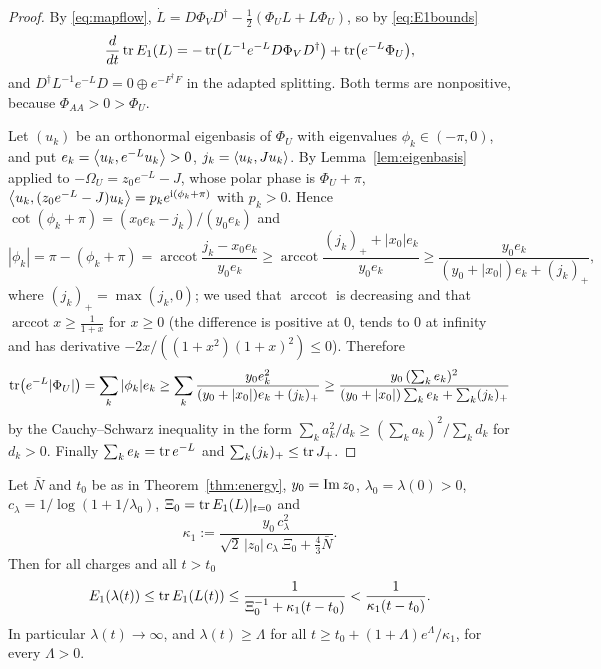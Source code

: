 \begin{proof}
By \eqref{eq:mapflow},
$\dot L=D\Phi_VD^\dagger-\frac12(\Phi_UL+L\Phi_U)$, so by \eqref{eq:E1bounds}
\[
 \frac d{dt}\operatorname{tr} E_1(L)=-\operatorname{tr}\bigl(L^{-1}e^{-L}D\Phi_VD^\dagger\bigr)+\operatorname{tr}\bigl(e^{-L}\Phi_U\bigr),
\]
and $D^\dagger L^{-1}e^{-L}D=0\oplus e^{-F^\dagger F}$ in the adapted
splitting. Both terms are nonpositive, because $\Phi_{AA}>0>\Phi_U$.

Let $(u_k)$ be an orthonormal eigenbasis of $\Phi_U$ with eigenvalues
$\phi_k\in(-\pi,0)$, and put $e_k=\left\langle u_k,e^{-L}u_k\right\rangle>0$,
$j_k=\left\langle u_k,Ju_k\right\rangle$. By Lemma~\ref{lem:eigenbasis} applied to
$-\Omega_U=z_0e^{-L}-J$, whose polar phase is $\Phi_U+\pi$,
$\left\langle u_k,(z_0e^{-L}-J)u_k\right\rangle=p_ke^{\mathrm i(\phi_k+\pi)}$ with $p_k>0$. Hence
$\cot(\phi_k+\pi)=(x_0e_k-j_k)/(y_0e_k)$ and
\[
 |\phi_k|=\pi-(\phi_k+\pi)=\operatorname{arccot}\frac{j_k-x_0e_k}{y_0e_k}
 \geq\operatorname{arccot}\frac{(j_k)_++|x_0|e_k}{y_0e_k}
 \geq\frac{y_0e_k}{(y_0+|x_0|)e_k+(j_k)_+},
\]
where $(j_k)_+=\max(j_k,0)$; we used that $\operatorname{arccot}$ is
decreasing and that $\operatorname{arccot}x\geq\frac1{1+x}$ for $x\geq0$ (the
difference is positive at $0$, tends to $0$ at infinity and has derivative
$-2x/((1+x^2)(1+x)^2)\leq0$). Therefore
\[
 \operatorname{tr}\bigl(e^{-L}|\Phi_U|\bigr)=\sum_k|\phi_k|e_k
 \geq\sum_k\frac{y_0e_k^2}{(y_0+|x_0|)e_k+(j_k)_+}
 \geq\frac{y_0\,(\sum_ke_k)^2}{(y_0+|x_0|)\sum_ke_k+\sum_k(j_k)_+}
\]
by the Cauchy--Schwarz inequality in the form
$\sum_ka_k^2/d_k\geq(\sum_ka_k)^2/\sum_kd_k$ for $d_k>0$. Finally
$\sum_ke_k=\operatorname{tr} e^{-L}$ and $\sum_k(j_k)_+\leq\operatorname{tr} J_+$.
\end{proof}

\begin{theorem}[Growth]\label{thm:growth}
Let $\bar N$ and $t_0$ be as in Theorem~\ref{thm:energy}, $y_0=\operatorname{Im} z_0$,
$\lambda_0=\lambda(0)>0$, $c_\lambda=1/\log(1+1/\lambda_0)$,
$\Xi_0=\operatorname{tr} E_1(L)|_{t=0}$ and
\[
 \kappa_1:=\frac{y_0\,c_\lambda^2}{\sqrt2\,|z_0|\,c_\lambda\,\Xi_0+\frac43\bar N}.
\]
Then for all charges and all $t>t_0$
\[
 E_1(\lambda(t))\leq\operatorname{tr} E_1(L(t))\leq\frac1{\Xi_0^{-1}+\kappa_1(t-t_0)}<\frac1{\kappa_1(t-t_0)}.
\]
In particular $\lambda(t)\to\infty$, and $\lambda(t)\geq\Lambda$ for all
$t\geq t_0+(1+\Lambda)e^\Lambda/\kappa_1$, for every $\Lambda>0$.
\end{theorem}

